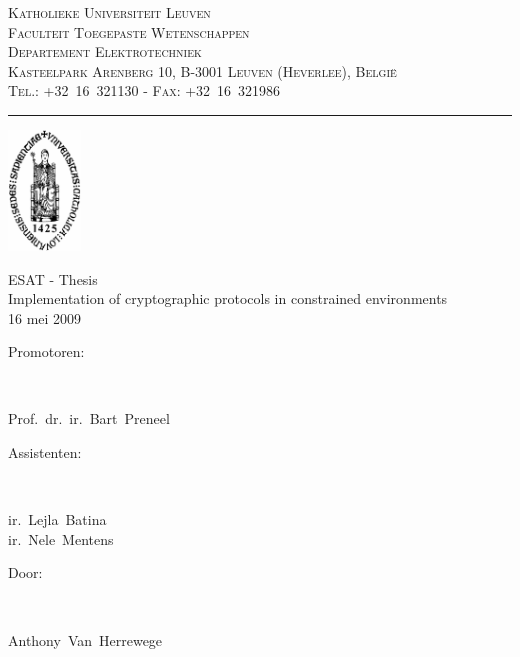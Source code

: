 \documentclass[a4paper]{article}    %
\newcommand{\vak}{ESAT - Thesis}
\newcommand{\opgave}{Implementation of cryptographic protocols in constrained environments}
\newcommand{\titel}{{\LARGE \vak}\\[2mm]
{\Large \opgave}}
\newcommand{\datum}{16 mei 2009}
\newcommand{\departement}{Departement Elektrotechniek}
\newcommand{\depadres}{Kasteelpark Arenberg 10, B-3001 Leuven (Heverlee), Belgi\"e}
\newcommand{\depcontact}{Tel.: +32~16~321130 - Fax: +32~16~321986}
\newcommand{\professoren}{Prof.~dr.~ir.~Bart~Preneel}
\newcommand{\assistenten}{ir.~Lejla~Batina\\ir.~Nele~Mentens}
\newcommand{\student}{Anthony~Van~Herrewege}
\begin{document}
\thispagestyle{empty}

\begin{minipage}[c]{100mm}
\small
\textsc{Katholieke Universiteit Leuven\\
Faculteit Toegepaste Wetenschappen\\
\departement\\[3mm]
\depadres\\
\depcontact}
\end{minipage}
\hfill
\begin{minipage}{45mm}
\parbox[b]{15mm}{\rule{1pt}{32mm}}
\includegraphics[height=32mm,bb=0 0 309 520]{voorblad-sedes}
\end{minipage}


\begin{center}
\parbox[c]{0.7\textwidth}{
    \centering
    \textsf{\titel\\[6mm]
            {\small \datum}}
}
\end{center}


\begin{minipage}{60mm}
\textsf{{\large Promotoren:\\}}
\parbox[t]{3mm}{~}
\parbox[t]{70mm}{\textsf{\professoren}\\[3mm]}
\textsf{{\large Assistenten:}}\\
\parbox[t]{3mm}{~}
\parbox[t]{50mm}{\textsf{\assistenten}}
\end{minipage}
\hfill
\begin{minipage}{50mm}
\textsf{{\large Door:\\}}
\parbox[t]{3mm}{~}
\parbox[t]{60mm}{\textsf{\student}}
\end{minipage}
\end{document}
